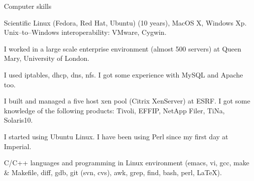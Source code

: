 \begin{rubric}{Computer skills}


\entry*[9 years]
Scientific Linux (Fedora, Red Hat, Ubuntu) (10 years), MacOS X,
Windows Xp.
Unix--to--Windows interoperability: VMware, Cygwin.

\entry*
I worked in a large scale enterprise environment (almost 500 servers)
at Queen Mary, University of London.


I used iptables, dhcp, dns, nfs. %
I got some experience with MySQL and Apache
too.

\entry*
I built and managed a five host xen pool (Citrix XenServer) at ESRF.
I got some knowledge of the following products: Tivoli, EFFIP, 
NetApp Filer, TiNa, Solaris10.

\entry*
I started using Ubuntu Linux. I have been using Perl since my first
day at Imperial.




\entry*[4 years]
C/C++ languages and programming in Linux environment (emacs, vi, gcc, make 
\& Makefile, diff, gdb, git (svn, cvs), awk, grep, find, bash, 
perl, 
\LaTeX).



\end{rubric}
